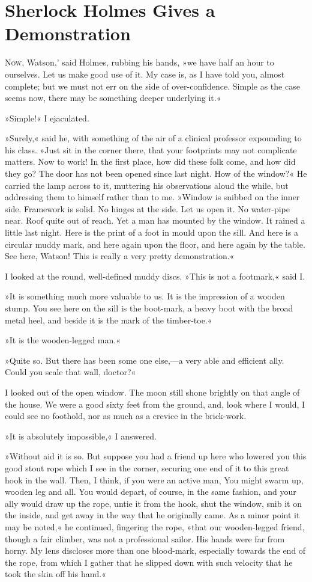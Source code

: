 \chapter{Sherlock Holmes Gives a Demonstration}
\lettrine[ante=`,lines=4]{N}{ow}, Watson,' said Holmes, rubbing his hands, »we have half an hour to ourselves. Let us make good use of it. My case is, as I have told you, almost complete; but we must not err on the side of over-confidence. Simple as the case seems now, there may be something deeper underlying it.«

»Simple!« I ejaculated.

»Surely,« said he, with something of the air of a clinical professor expounding to his class. »Just sit in the corner there, that your footprints may not complicate matters. Now to work! In the first place, how did these folk come, and how did they go? The door has not been opened since last night. How of the window?« He carried the lamp across to it, muttering his observations aloud the while, but addressing them to himself rather than to me. »Window is snibbed on the inner side. Framework is solid. No hinges at the side. Let us open it. No water-pipe near. Roof quite out of reach. Yet a man has mounted by the window. It rained a little last night. Here is the print of a foot in mould upon the sill. And here is a circular muddy mark, and here again upon the floor, and here again by the table. See here, Watson! This is really a very pretty demonstration.«

I looked at the round, well-defined muddy discs. »This is not a footmark,« said I.

»It is something much more valuable to us. It is the impression of a wooden stump. You see here on the sill is the boot-mark, a heavy boot with the broad metal heel, and beside it is the mark of the timber-toe.«

»It is the wooden-legged man.«

»Quite so. But there has been some one else,—a very able and efficient ally. Could you scale that wall, doctor?«

I looked out of the open window. The moon still shone brightly on that angle of the house. We were a good sixty feet from the ground, and, look where I would, I could see no foothold, nor as much as a crevice in the brick-work.

»It is absolutely impossible,« I answered.

»Without aid it is so. But suppose you had a friend up here who lowered you this good stout rope which I see in the corner, securing one end of it to this great hook in the wall. Then, I think, if you were an active man, You might swarm up, wooden leg and all. You would depart, of course, in the same fashion, and your ally would draw up the rope, untie it from the hook, shut the window, snib it on the inside, and get away in the way that he originally came. As a minor point it may be noted,« he continued, fingering the rope, »that our wooden-legged friend, though a fair climber, was not a professional sailor. His hands were far from horny. My lens discloses more than one blood-mark, especially towards the end of the rope, from which I gather that he slipped down with such velocity that he took the skin off his hand.«

